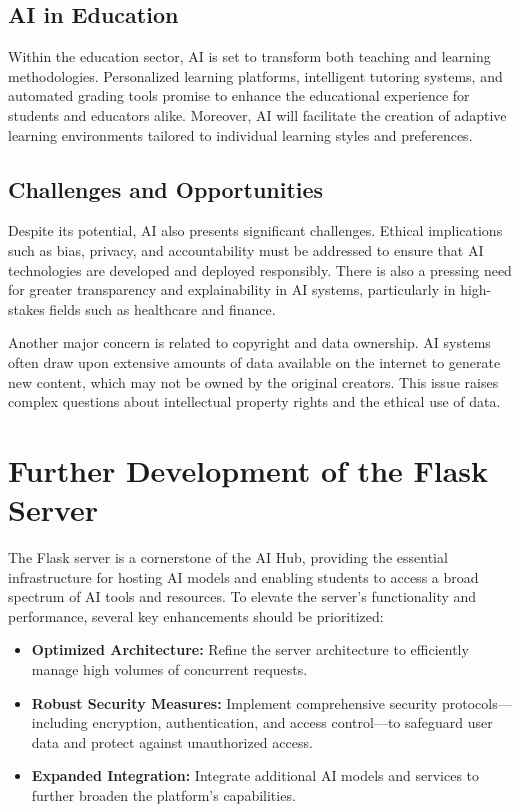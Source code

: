 \subsection{AI in Education}

Within the education sector, AI is set to transform both teaching and learning methodologies. Personalized learning platforms, intelligent tutoring systems, and automated grading tools promise to enhance the educational experience for students and educators alike. Moreover, AI will facilitate the creation of adaptive learning environments tailored to individual learning styles and preferences.

\subsection{Challenges and Opportunities}

Despite its potential, AI also presents significant challenges. Ethical implications such as bias, privacy, and accountability must be addressed to ensure that AI technologies are developed and deployed responsibly. There is also a pressing need for greater transparency and explainability in AI systems, particularly in high-stakes fields such as healthcare and finance.

Another major concern is related to copyright and data ownership. AI systems often draw upon extensive amounts of data available on the internet to generate new content, which may not be owned by the original creators. This issue raises complex questions about intellectual property rights and the ethical use of data.

\section{Further Development of the Flask Server}

The Flask server is a cornerstone of the AI Hub, providing the essential infrastructure for hosting AI models and enabling students to access a broad spectrum of AI tools and resources. To elevate the server’s functionality and performance, several key enhancements should be prioritized:

\begin{itemize}
    \item \textbf{Optimized Architecture:} Refine the server architecture to efficiently manage high volumes of concurrent requests.
    \item \textbf{Robust Security Measures:} Implement comprehensive security protocols—including encryption, authentication, and access control—to safeguard user data and protect against unauthorized access.
    \item \textbf{Expanded Integration:} Integrate additional AI models and services to further broaden the platform’s capabilities.
\end{itemize}

